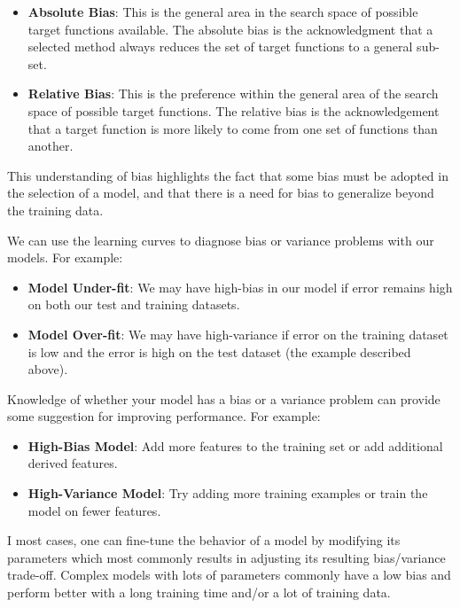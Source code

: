 \begin{itemize}
	\item \textbf{Absolute Bias}: This is the general area in the search space of possible target functions available. The absolute bias is the acknowledgment that a selected method always reduces the set of target functions to a general sub-set.
	\item \textbf{Relative Bias}: This is the preference within the general area of the search space of possible target functions. The relative bias is the acknowledgement that a target function is more likely to come from one set of functions than another.
\end{itemize} 

This understanding of bias highlights the fact that some bias must be adopted in the selection of a model, and that there is a need for bias to generalize beyond the training data.

We can use the learning curves to diagnose bias or variance problems with our models. For example:

\begin{itemize}
	\item \textbf{Model Under-fit}: We may have high-bias in our model if error remains high on both our test and training datasets.
	\item \textbf{Model Over-fit}: We may have high-variance if error on the training dataset is low and the error is high on the test dataset (the example described above).
\end{itemize}

Knowledge of whether your model has a bias or a variance problem can provide some suggestion for improving performance. For example:

\begin{itemize}
	\item \textbf{High-Bias Model}: Add more features to the training set or add additional derived features.
	\item \textbf{High-Variance Model}: Try adding more training examples or train the model on fewer features.
\end{itemize}

I most cases, one can fine-tune the behavior of a model by modifying its parameters which most commonly results in adjusting its resulting bias/variance trade-off. Complex models with lots of parameters commonly have a low bias and perform better with a long training time and/or a lot of training data.
